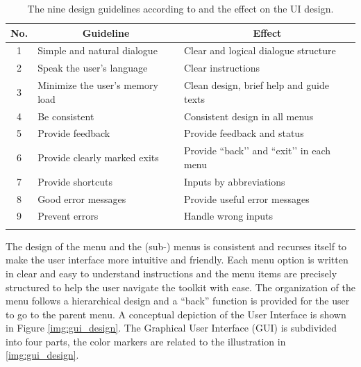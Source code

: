 \begin{table}[!ht]
\begin{center}
\begin{tabular}{cll}
\toprule
\multicolumn{1}{c}{\textbf{No.}} &\multicolumn{1}{c}{\textbf{Guideline}} & \multicolumn{1}{c}{\textbf{Effect}}\\
\midrule
\hline
1 & Simple and natural dialogue & Clear and logical dialogue structure\\

2 & Speak the user’s language & Clear instructions\\

3 & Minimize the user’s memory load & Clean design, brief help and guide texts\\

4 & Be consistent & Consistent design in all menus\\

5 & Provide feedback & Provide feedback and status\\

6 & Provide clearly marked exits & Provide ``back’’ and ``exit’’ in each menu\\

7 & Provide shortcuts & Inputs by abbreviations \\

8 & Good error messages & Provide useful error messages\\

9 & Prevent errors & Handle wrong inputs \\
\hline
\addlinespace
\bottomrule
\end{tabular}
\end{center}
\caption{The nine design guidelines according to \cite{67} and the effect on the UI design.}
\label{tab:guidline_design}
\end{table}

The design of the menu and the (sub-) menus is consistent and recurses itself to make the user interface more intuitive and friendly. Each menu option is written in clear and easy to understand instructions and the menu items are precisely structured to help the user navigate the toolkit with ease. The organization of the menu follows a hierarchical design and a ``back'' function is provided for the user to go to the parent menu. A conceptual depiction of the User Interface is shown in Figure
\ref{img:gui_design}. The Graphical User Interface (GUI) is subdivided into four parts, the color markers are related to the illustration in \ref{img:gui_design}.


